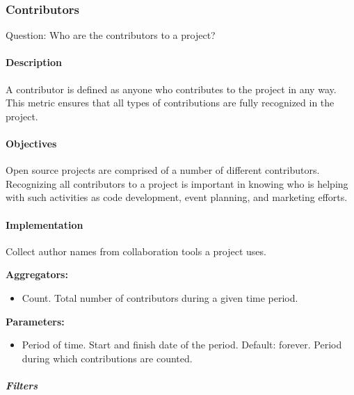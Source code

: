 \hypertarget{contributors}{%
\subsubsection{Contributors}\label{contributors}}

Question: Who are the contributors to a project?

\hypertarget{description}{%
\paragraph{Description}\label{description}}

A contributor is defined as anyone who contributes to the project in any
way. This metric ensures that all types of contributions are fully
recognized in the project.

\hypertarget{objectives}{%
\paragraph{Objectives}\label{objectives}}

Open source projects are comprised of a number of different
contributors. Recognizing all contributors to a project is important in
knowing who is helping with such activities as code development, event
planning, and marketing efforts.

\hypertarget{implementation}{%
\paragraph{Implementation}\label{implementation}}

Collect author names from collaboration tools a project uses.

\textbf{Aggregators:}

\begin{itemize}
\tightlist
\item
  Count. Total number of contributors during a given time period.
\end{itemize}

\textbf{Parameters:}

\begin{itemize}
\tightlist
\item
  Period of time. Start and finish date of the period. Default: forever.
  Period during which contributions are counted.
\end{itemize}

\hypertarget{filters}{%
\subparagraph{Filters}\label{filters}}

